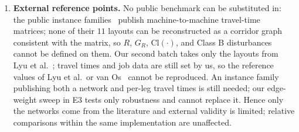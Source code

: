 \documentclass[manuscript,screen,review]{acmart}
\begin{document}
\begin{enumerate}[leftmargin=1.6em,itemsep=0.3em]
\item \textbf{External reference points.} No public benchmark can be substituted in: the public instance families~\cite{homayouni2021production,fontes2023hybrid} publish machine-to-machine travel-time matrices; none of their \(11\) layouts can be reconstructed as a corridor graph consistent with the matrix,
so \(R\), \(G_R\), \(\mathrm{Cl}(\cdot)\), and Class B disturbances cannot be defined on them. Our second batch takes only the layouts from Lyu et al.~\cite{lyu2019approach}; travel times and job data are still set by us, so the reference values of Lyu et al.\ or van Os~\cite{vanos2026exact} cannot be reproduced.
An instance family publishing both a network and per-leg travel times is still needed; our edge-weight sweep in E3 tests only robustness and cannot replace it.
Hence only the networks come from the literature and external validity is limited; relative comparisons within the same implementation are unaffected.
\end{enumerate}



\end{document}
